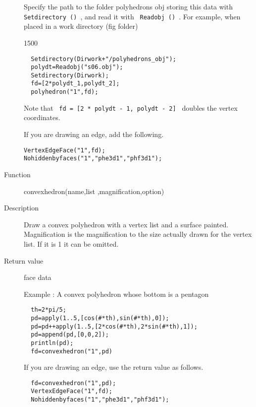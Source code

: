 \documentclass[papersize,a4paper,12pt]{article}
\begin{document}
\begin{description}
Specify the path to the folder polyhedrons obj storing this data with \verb| Setdirectory () |, and read it with \verb | Readobj () |. For example, when placed in a work directory (fig folder)
 
\begin{layer}{150}{0}
\end{layer}

\begin{verbatim}
  Setdirectory(Dirwork+"/polyhedrons_obj");
  polydt=Readobj("s06.obj");
  Setdirectory(Dirwork);
  fd=[2*polydt_1,polydt_2];
  polyhedron("1",fd);
\end{verbatim}

Note that \verb| fd = [2 * polydt - 1, polydt - 2] | doubles the vertex coordinates.

If you are drawing an edge, add the following.

\begin{verbatim}
VertexEdgeFace("1",fd);
Nohiddenbyfaces("1","phe3d1","phf3d1");
\end{verbatim}


\hypertarget{convexhedron}{}
\item[Function] convexhedron(name,list ,magnification,option)
\item[Description] Draw a convex polyhedron with a vertex list and a surface painted. Magnification is the magnification to the size actually drawn for the vertex list. If it is 1 it can be omitted.
\item[Return value] face data

\vspace{\baselineskip}
Example : A convex polyhedron whose bottom is a pentagon
\begin{verbatim}
  th=2*pi/5;
  pd=apply(1..5,[cos(#*th),sin(#*th),0]);
  pd=pd++apply(1..5,[2*cos(#*th),2*sin(#*th),1]);
  pd=append(pd,[0,0,2]);
  println(pd);
  fd=convexhedron("1",pd)
\end{verbatim}
\hspace{20mm}

If you are drawing an edge, use the return value as follows.

\begin{verbatim}
  fd=convexhedron("1",pd);
  VertexEdgeFace("1",fd);
  Nohiddenbyfaces("1","phe3d1","phf3d1");
\end{verbatim}


\end{description}
\end{document}
